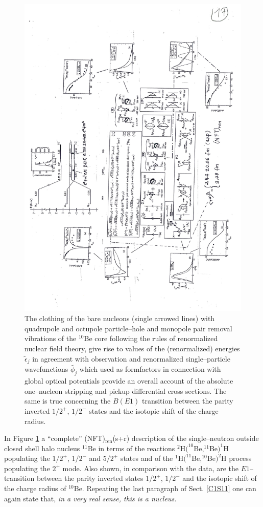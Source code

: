       \begin{figure}
      \centerline{\includegraphics*[width=14cm,angle=0]{C8/figsC8/Fig6_3_1}}
      	\caption{The clothing of the bare nucleons (single arrowed lines) with quadrupole and octupole particle--hole and monopole pair removal vibrations of the $^{10}$Be core following the rules of renormalized nuclear field theory, give rise to values of the (renormalized) energies $\tilde\epsilon_j$ in agreement with observation and renormalized single--particle wavefunctions $\tilde{\phi_j}$ which used as formfactors in connection with global optical potentials provide an overall account of the absolute one--nucleon stripping and pickup differential cross sections. The same is true concerning the $B(E1)$ transition between the parity inverted $1/2^+$, $1/2^-$ states and the isotopic shift of the charge radius.}\label{fig6.3.1}
      \end{figure} 
In Figure \ref{fig6.3.1} a ``complete'' (NFT)$_{\text{ren}}$(s+r) description of the single--neutron outside closed shell halo nucleus $^{11}$Be in terms of the reactions $^2$H$(^{10}$Be,$^{11}$Be$ )^1$H populating the $1/2^+$, $1/2^-$ and $5/2^+$ states and of the $^1$H$(^{11}$Be,$^{10}$Be$)^2$H process populating the $2^+$ mode. Also shown, in comparison with the data, are the $E1$--transition between the parity inverted states $1/2^+$, $1/2^-$ and the isotopic shift of the charge radius of $^{10}$Be.  Repeating the last paragraph of Sect. \ref{C1S11} one can again state that, \textit{in a very real sense, this is a nucleus.} 
